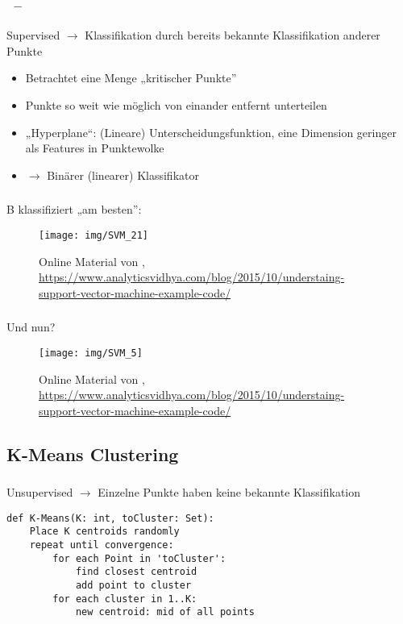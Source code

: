 \begin{frame}
    \frametitle{\insertsubsection \ -- \cite{datamining2011}}
    Supervised $\rightarrow$ Klassifikation durch bereits bekannte Klassifikation anderer Punkte 
    \vspace{1em}
    \begin{itemize}
        \setlength\itemsep{0.8em}
        \item Betrachtet eine Menge „kritischer Punkte”
        \item Punkte so weit wie möglich von einander entfernt unterteilen
        \item „Hyperplane“: (Lineare) Unterscheidungsfunktion, eine Dimension geringer als Features in Punktewolke
        \item $\rightarrow$ Binärer (linearer) Klassifikator
    \end{itemize}
\end{frame}

\begin{frame}
    \frametitle{\insertsubsection}
     B klassifiziert „am besten”:
    \begin{figure}[H]
        \centering
        \texttt{[image: img/SVM\_21]}
        \caption{Online Material von \cite{ray2015}, \url{https://www.analyticsvidhya.com/blog/2015/10/understaing-support-vector-machine-example-code/}\label{fig:svm}}
    \end{figure}
\end{frame}

\begin{frame}
    \frametitle{\insertsubsection}
    Und nun?
    \begin{figure}[H]
        \centering
        \texttt{[image: img/SVM\_5]}
        \caption{Online Material von \cite{ray2015}, \url{https://www.analyticsvidhya.com/blog/2015/10/understaing-support-vector-machine-example-code/}\label{fig:svm2}}
    \end{figure}
\end{frame}

\subsection{K-Means Clustering}

\begin{frame}[fragile]
    \frametitle{\insertsubsection}
    Unsupervised $\rightarrow$ Einzelne Punkte haben keine bekannte Klassifikation \cite{datamining2011}
    \vspace{1em}
    \begin{lstlisting}
def K-Means(K: int, toCluster: Set):
    Place K centroids randomly
    repeat until convergence:
        for each Point in 'toCluster':
            find closest centroid
            add point to cluster
        for each cluster in 1..K:
            new centroid: mid of all points
    \end{lstlisting}
    \cite{lavrenko2013}
\end{frame}


